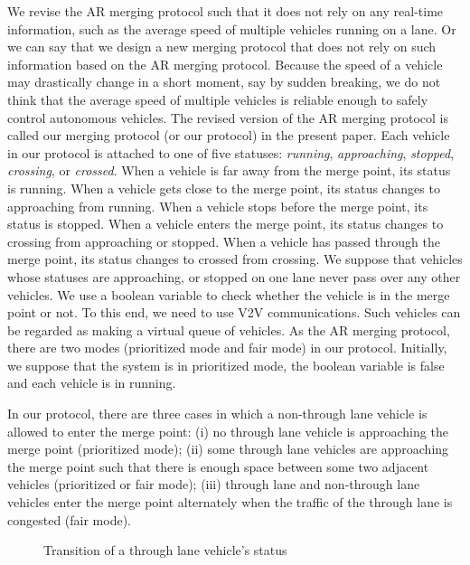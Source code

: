 \documentclass[10pt, conference, compsocconf]{IEEEtran}
\begin{document}
We revise the AR merging protocol such that it does not rely on any
real-time information, such as the average speed of multiple vehicles
running on a lane. Or we can say that we design a new merging protocol
that does not rely on such information based on the AR merging
protocol. Because the speed of a vehicle may drastically change in a
short moment, say by sudden breaking, we do not think that the average
speed of multiple vehicles is reliable enough to safely control
autonomous vehicles. The revised version of the AR merging protocol is
called our merging protocol (or our protocol) in the present paper.
Each vehicle in our protocol is attached to one of five statuses:
\textit{running}, \textit{approaching}, \textit{stopped},
\textit{crossing}, or \textit{crossed}.  When a vehicle
is far away from the merge point, its status is running. When a
vehicle gets close to the merge point, its status changes to
approaching from running. When a vehicle stops before the merge point,
its status is stopped. When a vehicle enters the
merge point, its status changes to crossing from approaching or stopped. 
When a vehicle has passed through the merge point, its
status changes to crossed from crossing. We suppose that vehicles
whose statuses are approaching, or stopped on one lane never
pass over any other vehicles. We use a boolean variable to check whether
the vehicle is in the merge point or not. To this end, we need to use V2V
communications. Such vehicles can be regarded as making a virtual
queue of vehicles. As the AR merging protocol, there are two modes
(prioritized mode and fair mode) in our protocol. Initially,
we suppose that the system is in prioritized mode, the boolean variable is false
and each vehicle is in running.

In our protocol, there are three cases in which a non-through lane
vehicle is allowed to enter the merge point: (i) no through lane
vehicle is approaching the merge point (prioritized mode); (ii) some through lane
vehicles are approaching the merge point such that there is enough
space between some two adjacent vehicles (prioritized or fair mode); (iii) through lane and
non-through lane vehicles enter the merge point alternately when the
traffic of the through lane is congested (fair mode).

\begin{figure}[h]
\begin{center}
\end{center}
\caption{Transition of a through lane vehicle's status}
\label{throughLaneStatus}
\end{figure}
\end{document}
